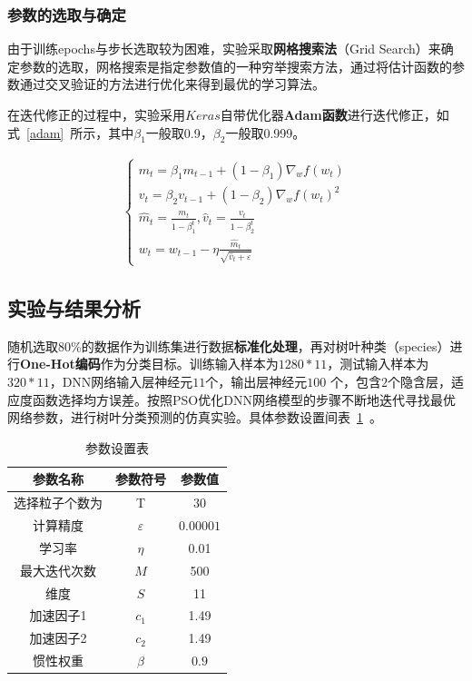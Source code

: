 \documentclass{whutmod}
\begin{document}
	\subsubsection{参数的选取与确定}
	由于训练epochs与步长选取较为困难，实验采取\textbf{网格搜索法}（Grid Search）来确定参数的选取，网格搜索是指定参数值的一种穷举搜索方法，通过将估计函数的参数通过交叉验证的方法进行优化来得到最优的学习算法。
	
	在迭代修正的过程中，实验采用$Keras$自带优化器\textbf{Adam函数}进行迭代修正，如式~\ref{adam}~所示，其中$\beta_{1}$一般取0.9，$\beta_{2}$一般取0.999。
	
	\begin{gather*}\label{adam}
	\left\{\begin{array}{l}{m_{t}=\beta_{1} m_{t-1}+\left(1-\beta_{1}\right) \nabla_{w} f\left(w_{t}\right)} \\ {v_{t}=\beta_{2} v_{t-1}+\left(1-\beta_{2}\right) \nabla_{w} f\left(w_{t}\right)^{2}} \\ {\widehat{m}_{t}=\frac{m_{t}}{1-\beta_{1}^{t}}, \hat{v}_{t}=\frac{v_{t}}{1-\beta_{2}^{t}}} \\ {w_{t}=w_{t-1}-\eta \frac{\widehat{m}_{t}}{\sqrt{\hat{v}_{t}+\varepsilon}}}\end{array}\right.
	\end{gather*}


	\subsection{实验与结果分析}
	随机选取80\%的数据作为训练集进行数据\textbf{标准化处理}，再对树叶种类（species）进行\textbf{One-Hot编码}作为分类目标。训练输入样本为$1280*11$，测试输入样本为$320*11$，DNN网络输入层神经元$11$个，输出层神经元$100$ 个，包含$2$个隐含层，适应度函数选择均方误差。按照PSO优化DNN网络模型的步骤不断地迭代寻找最优网络参数，进行树叶分类预测的仿真实验。具体参数设置间表~\ref{canshu}~。
			\begin{table}[H]
		\centering		\caption{参数设置表}\label{canshu}
		\begin{tabular}{ccc}
			\toprule[2pt]
			\multicolumn{1}{m{4cm}}{\centering 参数名称}
			& \multicolumn{1}{m{3cm}}{\centering 参数符号}
			&\multicolumn{1}{m{3cm}}{\centering 参数值}
			\\
			\midrule[1pt]
			选择粒子个数为	 &  T &$30$ \\ 
			计算精度	 &  $\varepsilon$&$0.00001$  \\ 
			学习率	 &  $\eta $ &0.01 \\ 
			最大迭代次数	 &  $M$ &500\\ 
						维度	 &  $S$ &11 \\ 
									加速因子1	 &  $c_{1}$ &1.49\\ 
												加速因子2	 &  $c_{2}$ &1.49 \\ 
			惯性权重	 &  $\beta $ &$0.9$ \\ 
			\bottomrule[2pt]	
		\end{tabular}

	\end{table}
	
\end{document}
